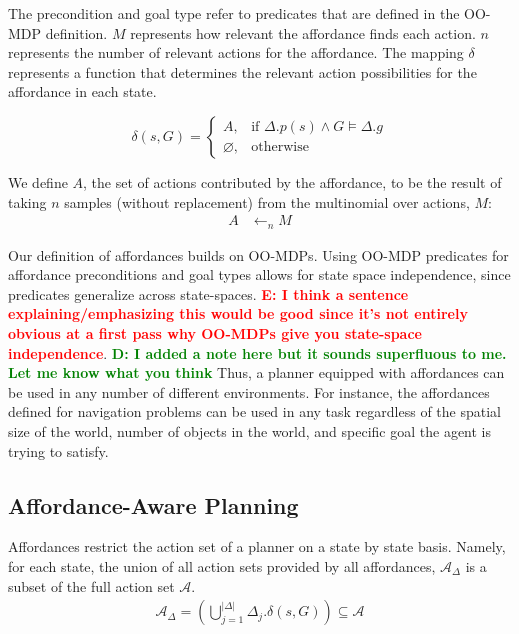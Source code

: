\documentclass[conference]{IEEEtran}
\newcommand{\dnote}[1]{\textcolor{Green}{\textbf{D: #1}}}
\newcommand{\enote}[1]{\textcolor{Red}{\textbf{E: #1}}}
\begin{document}
The precondition and goal type refer to predicates that are defined in the OO-MDP definition.
$M$ represents how relevant the affordance finds each action. $n$ represents
the number of relevant actions for the affordance. The mapping $\delta$
represents a function that determines the relevant action possibilities for the affordance in each state.

\begin{equation}
\delta(s,G)= 
\begin{cases}
    A, & \text{if } \Delta.p(s) \wedge G \models \Delta.g \\
    \varnothing,              & \text{otherwise}
\end{cases}
\label{eq:delta_mapping}
\end{equation}

We define $A$, the set of actions contributed by the affordance, to be the result of taking $n$ samples (without replacement) from the multinomial over actions, $M$:
\begin{align}
A &\leftarrow_n M
\end{align}

Our definition of affordances builds on OO-MDPs. Using OO-MDP predicates for affordance
preconditions and goal types allows for state space independence, since predicates generalize across state-spaces. 
\enote{I think a sentence explaining/emphasizing this would be good since it's not entirely obvious at a first pass why OO-MDPs give you state-space independence}. \dnote{I added a note here but it sounds superfluous to me. Let me know what you think} 
Thus, a planner equipped with affordances can be used in any number of
different environments. For instance, the affordances defined for 
navigation problems can be used in any task regardless of the spatial size of the world, 
number of objects in the world, and specific goal the agent is trying to satisfy.

\subsection{Affordance-Aware Planning}
Affordances restrict the action set of a planner on a state by state basis. Namely, for each state, the union of all action sets provided by all affordances, $\mathcal{A}_{\Delta}$ is a subset of the full action set $\mathcal{A}$. 
\begin{align}
\mathcal{A}_{\Delta} = \left(\bigcup\limits_{j = 1}^{|\Delta|} \Delta_j.\delta(s,G) \right) \subseteq \mathcal{A}
\label{eq:afford_union}
\end{align}
\end{document}
